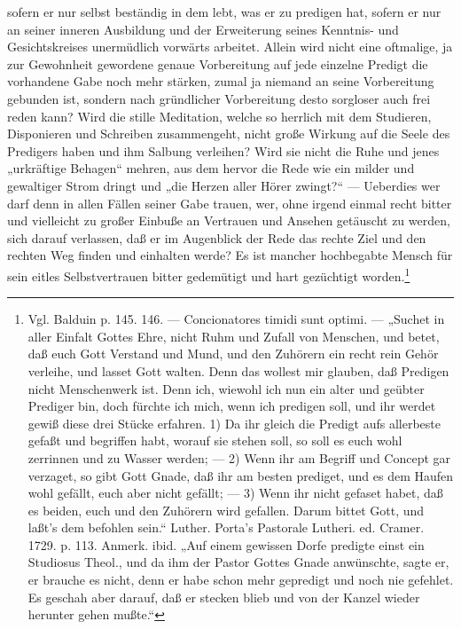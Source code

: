 sofern er nur selbst beständig in dem lebt, was er zu predigen hat, sofern er nur an seiner inneren Ausbildung und der Erweiterung seines Kenntnis- und Gesichtskreises unermüdlich vorwärts arbeitet. Allein wird nicht eine oftmalige, ja zur Gewohnheit gewordene genaue Vorbereitung auf jede einzelne Predigt die vorhandene Gabe noch mehr stärken, zumal ja niemand an seine Vorbereitung gebunden ist, sondern nach gründlicher Vorbereitung desto sorgloser auch frei reden kann? Wird die stille Meditation, welche so herrlich mit dem Studieren, Disponieren und Schreiben zusammengeht, nicht große Wirkung auf die Seele des Predigers haben und ihm Salbung verleihen? Wird sie nicht die Ruhe und jenes „urkräftige Behagen“ mehren, aus dem hervor die Rede wie ein milder und gewaltiger Strom dringt und „die Herzen aller Hörer zwingt?“ — Ueberdies wer darf denn in allen Fällen seiner Gabe trauen, wer, ohne irgend einmal recht bitter und vielleicht zu großer Einbuße an Vertrauen und Ansehen getäuscht zu werden, sich darauf verlassen, daß er im Augenblick der Rede das rechte Ziel und den rechten Weg finden und einhalten werde? Es ist mancher hochbegabte Mensch für sein eitles Selbstvertrauen bitter gedemütigt und hart gezüchtigt worden.\footnote{Vgl. Balduin p. 145. 146. — Concionatores timidi sunt optimi. — „Suchet in aller Einfalt Gottes Ehre, nicht Ruhm und Zufall von Menschen, und betet, daß euch Gott Verstand und Mund, und den Zuhörern ein recht rein Gehör verleihe, und lasset Gott walten. Denn das wollest mir glauben, daß Predigen nicht Menschenwerk ist. Denn ich, wiewohl ich nun ein alter und geübter Prediger bin, doch fürchte ich mich, wenn ich predigen soll, und ihr werdet gewiß diese drei Stücke erfahren. 1) Da ihr gleich die Predigt aufs allerbeste gefaßt und begriffen habt, worauf sie stehen soll, so soll es euch wohl zerrinnen und zu Wasser werden; — 2) Wenn ihr am Begriff und Concept gar verzaget, so gibt Gott Gnade, daß ihr am besten prediget, und es dem Haufen wohl gefällt, euch aber nicht gefällt; — 3) Wenn ihr nicht gefaset habet, daß es beiden, euch und den Zuhörern wird gefallen. Darum bittet Gott, und laßt’s dem befohlen sein.“ Luther. Porta’s Pastorale Lutheri. ed. Cramer. 1729. p. 113. Anmerk. ibid. „Auf einem gewissen Dorfe predigte einst ein Studiosus Theol., und da ihm der Pastor Gottes Gnade anwünschte, sagte er, er brauche es nicht, denn er habe schon mehr gepredigt und noch nie gefehlet. Es geschah aber darauf, daß er stecken blieb und von der Kanzel wieder herunter gehen mußte.“}

